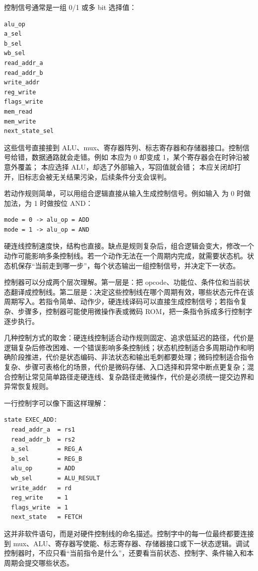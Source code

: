 控制信号通常是一组 0/1 或多 bit 选择值：

\begin{lstlisting}
alu_op
a_sel
b_sel
wb_sel
read_addr_a
read_addr_b
write_addr
reg_write
flags_write
mem_read
mem_write
next_state_sel
\end{lstlisting}

这些信号直接接到 ALU、mux、寄存器阵列、标志寄存器和存储器接口。控制信号给错，数据通路就会走错。例如  本应为 0 却变成 1，某个寄存器会在时钟沿被意外覆盖； 本应选择 ALU，却选了外部输入，写回值就会错； 本应关闭却打开，旧标志会被无关结果污染，后续条件分支会误判。

若动作规则简单，可以用组合逻辑直接从输入生成控制信号。例如输入  为 0 时做加法，为 1 时做按位 AND：

\begin{lstlisting}
mode = 0 -> alu_op = ADD
mode = 1 -> alu_op = AND
\end{lstlisting}

硬连线控制速度快，结构也直接。缺点是规则复杂后，组合逻辑会变大，修改一个动作可能影响多条控制线。若一个动作无法在一个周期内完成，就需要状态机。状态机保存“当前走到哪一步”，每个状态输出一组控制信号，并决定下一状态。

控制器可以分成两个层次理解。第一层是：把 opcode、功能位、条件位和当前状态翻译成控制线。第二层是：决定这些控制线在哪个周期有效，哪些状态元件在该周期写入。若指令简单、动作少，硬连线译码可以直接生成控制信号；若指令复杂、步骤多，控制器可能使用微操作表或微码 ROM，把一条指令拆成多行控制字逐步执行。

几种控制方式的取舍：硬连线控制适合动作规则固定、追求低延迟的路径，代价是逻辑复杂后修改困难、一个错误影响多条控制线；状态机控制适合多周期动作和明确阶段推进，代价是状态编码、非法状态和输出毛刺都要处理；微码控制适合指令复杂、步骤可表格化的场景，代价是微码存储、入口选择和异常中断点更复杂；混合控制让常见简单路径走硬连线、复杂路径走微操作，代价是必须统一提交边界和异常恢复规则。

一行控制字可以像下面这样理解：

\begin{lstlisting}
state EXEC_ADD:
  read_addr_a  = rs1
  read_addr_b  = rs2
  a_sel        = REG_A
  b_sel        = REG_B
  alu_op       = ADD
  wb_sel       = ALU_RESULT
  write_addr   = rd
  reg_write    = 1
  flags_write  = 1
  next_state   = FETCH
\end{lstlisting}

这并非软件语句，而是对硬件控制线的命名描述。控制字中的每一位最终都要连接到 mux、ALU、寄存器写使能、标志寄存器、存储器接口或下一状态逻辑。调试控制器时，不应只看“当前指令是什么”，还要看当前状态、控制字、条件输入和本周期会提交哪些状态。

